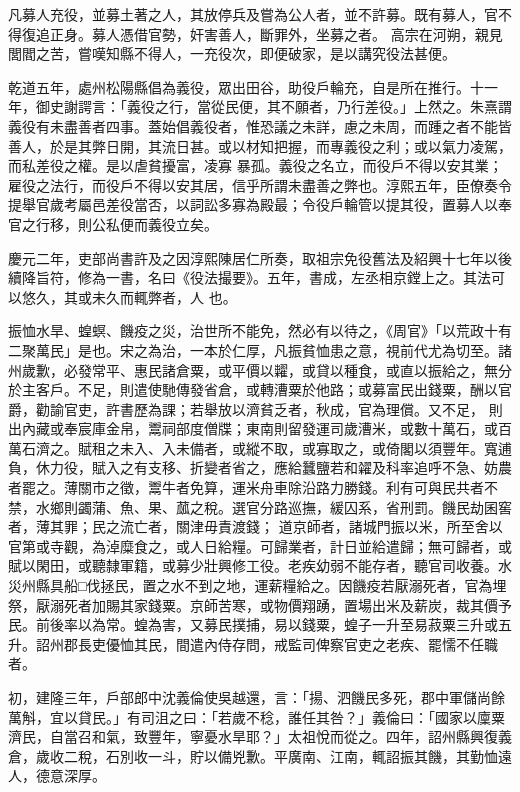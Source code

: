 \begin{pinyinscope}
 凡募人充役，並募土著之人，其放停兵及嘗為公人者，並不許募。既有募人，官不得復追正身。募人憑借官勢，奸害善人，斷罪外，坐募之者。
 高宗在河朔，親見閭閻之苦，嘗嘆知縣不得人，一充役次，即便破家，是以講究役法甚便。



 乾道五年，處州松陽縣倡為義役，眾出田谷，助役戶輪充，自是所在推行。十一年，御史謝諤言：「義役之行，當從民便，其不願者，乃行差役。」上然之。朱熹謂義役有未盡善者四事。蓋始倡義役者，惟恐議之未詳，慮之未周，而踵之者不能皆善人，於是其弊日開，其流日甚。或以材知把握，而專義役之利；或以氣力凌駕，而私差役之權。是以虐貧擾富，凌寡
 暴孤。義役之名立，而役戶不得以安其業；雇役之法行，而役戶不得以安其居，信乎所謂未盡善之弊也。淳熙五年，臣僚奏令提舉官歲考屬邑差役當否，以詞訟多寡為殿最；令役戶輪管以提其役，置募人以奉官之行移，則公私便而義役立矣。



 慶元二年，吏部尚書許及之因淳熙陳居仁所奏，取祖宗免役舊法及紹興十七年以後續降旨符，修為一書，名曰《役法撮要》。五年，書成，左丞相京鏜上之。其法可以悠久，其或未久而輒弊者，人
 也。



 振恤水旱、蝗螟、饑疫之災，治世所不能免，然必有以待之，《周官》「以荒政十有二聚萬民」是也。宋之為治，一本於仁厚，凡振貧恤患之意，視前代尤為切至。諸州歲歉，必發常平、惠民諸倉粟，或平價以糶，或貸以種食，或直以振給之，無分於主客戶。不足，則遣使馳傳發省倉，或轉漕粟於他路；或募富民出錢粟，酬以官爵，勸諭官吏，許書歷為課；若舉放以濟貧乏者，秋成，官為理償。又不足，
 則出內藏或奉宸庫金帛，鬻祠部度僧牒；東南則留發運司歲漕米，或數十萬石，或百萬石濟之。賦租之未入、入未備者，或縱不取，或寡取之，或倚閣以須豐年。寬逋負，休力役，賦入之有支移、折變者省之，應給蠶鹽若和糴及科率追呼不急、妨農者罷之。薄關市之徵，鬻牛者免算，運米舟車除沿路力勝錢。利有可與民共者不禁，水鄉則蠲蒲、魚、果、蓏之稅。選官分路巡撫，緩囚系，省刑罰。饑民劫囷窖者，薄其罪；民之流亡者，關津毋責渡錢；
 道京師者，諸城門振以米，所至舍以官第或寺觀，為淖糜食之，或人日給糧。可歸業者，計日並給遣歸；無可歸者，或賦以閑田，或聽隸軍籍，或募少壯興修工役。老疾幼弱不能存者，聽官司收養。水災州縣具船□伐拯民，置之水不到之地，運薪糧給之。因饑疫若厭溺死者，官為埋祭，厭溺死者加賜其家錢粟。京師苦寒，或物價翔踴，置場出米及薪炭，裁其價予民。前後率以為常。蝗為害，又募民撲捕，易以錢粟，蝗子一升至易菽粟三升或五
 升。詔州郡長吏優恤其民，間遣內侍存問，戒監司俾察官吏之老疾、罷懦不任職者。



 初，建隆三年，戶部郎中沈義倫使吳越還，言：「揚、泗饑民多死，郡中軍儲尚餘萬斛，宜以貸民。」有司沮之曰：「若歲不稔，誰任其咎？」義倫曰：「國家以廩粟濟民，自當召和氣，致豐年，寧憂水旱耶？」太祖悅而從之。四年，詔州縣興復義倉，歲收二稅，石別收一斗，貯以備兇歉。平廣南、江南，輒詔振其饑，其勤恤遠人，德意深厚。




\end{pinyinscope}
